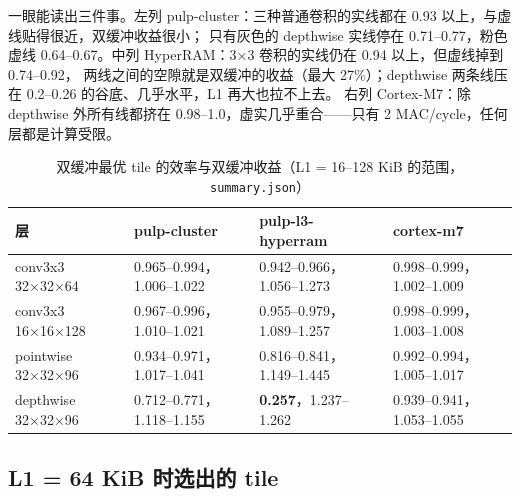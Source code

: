 \documentclass[11pt,a4paper]{ctexart}
\begin{document}
 一眼能读出三件事。左列 pulp-cluster：三种普通卷积的实线都在 0.93 以上，与虚线贴得很近，双缓冲收益很小；
只有灰色的 depthwise 实线停在 0.71--0.77，粉色虚线 0.64--0.67。中列 HyperRAM：3×3 卷积的实线仍在 0.94 以上，但虚线掉到 0.74--0.92，
两线之间的空隙就是双缓冲的收益（最大 27\%）；depthwise 两条线压在 0.2--0.26 的谷底、几乎水平，L1 再大也拉不上去。
右列 Cortex-M7：除 depthwise 外所有线都挤在 0.98--1.0，虚实几乎重合——只有 2 MAC/cycle，任何层都是计算受限。

\begin{table}[H]
\centering\small
\caption{双缓冲最优 tile 的效率与双缓冲收益（L1 = 16--128 KiB 的范围，\texttt{summary.json}）}\label{tab:doryrange}
\begin{tabular}{llll}
\toprule
层 & pulp-cluster & pulp-l3-hyperram & cortex-m7 \\
\midrule
conv3x3 32×32×64 & 0.965--0.994，1.006--1.022 & 0.942--0.966，1.056--1.273 & 0.998--0.999，1.002--1.009 \\
conv3x3 16×16×128 & 0.967--0.996，1.010--1.021 & 0.955--0.979，1.089--1.257 & 0.998--0.999，1.003--1.008 \\
pointwise 32×32×96 & 0.934--0.971，1.017--1.041 & 0.816--0.841，1.149--1.445 & 0.992--0.994，1.005--1.017 \\
depthwise 32×32×96 & 0.712--0.771，1.118--1.155 & \textbf{0.257}，1.237--1.262 & 0.939--0.941，1.053--1.055 \\
\bottomrule
\end{tabular}
\end{table}

\subsection{L1 = 64 KiB 时选出的 tile}
\end{document}

